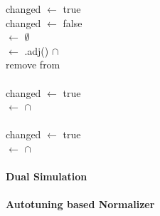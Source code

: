 \begin{algorithm}
    \BlankLine

    changed $\gets$ true \\
     { 
       changed $\gets$ false \\
       \For{\un $\gets$ \GN } {
            {
               \potpup $\gets$ $\emptyset$ \\
               \For{ \vn $\gets$ \potu } {
                   \potvup $\gets$ \GN.adj(\vn) $\cap$ \potup \\
                   \If{\potvup = $\empty$} {
                       remove \vn from \potu \\
                       \If{\potu = $\emptyset$} {
                           \KwRet{$\emptyset$} \\
                       }
                       changed $\gets$ true \\
                   }
                   \potpup $\gets$ \potpup $\cap$ \potvup \\
               }
               \If{ \potpup = $\emptyset$} {
                   \KwRet{$\emptyset$} \\
               }
                {
                   changed $\gets$ true \\
               }
               \potup $\gets$ \potup $\cap$ \potpup \\
           }
       }
   }
   \KwRet{$\emptyset$} \\
    \caption{\textbf{Dual Simulation}}\label{alg:DS}
\end{algorithm}

\paragraph{Autotuning based Normalizer}

